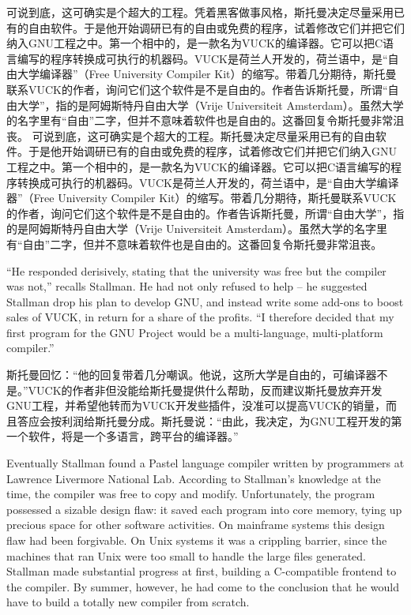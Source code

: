 \ifdefined\chs
\ifdefined\vone
可说到底，这可确实是个超大的工程。凭着黑客做事风格，斯托曼决定尽量采用已有的自由软件。于是他开始调研已有的自由或免费的程序，试着修改它们并把它们纳入GNU工程之中。第一个相中的，是一款名为VUCK的编译器。它可以把C语言编写的程序转换成可执行的机器码。VUCK是荷兰人开发的，荷兰语中，是``自由大学编译器''（Free University Compiler Kit）的缩写。带着几分期待，斯托曼联系VUCK的作者，询问它们这个软件是不是自由的。作者告诉斯托曼，所谓``自由大学''，指的是阿姆斯特丹自由大学（Vrije Universiteit Amsterdam）。虽然大学的名字里有``自由''二字，但并不意味着软件也是自由的。这番回复令斯托曼非常沮丧。
\fi
\ifdefined\vtwo
可说到底，这可确实是个超大的工程。斯托曼决定尽量采用已有的自由软件。于是他开始调研已有的自由或免费的程序，试着修改它们并把它们纳入GNU工程之中。第一个相中的，是一款名为VUCK的编译器。它可以把C语言编写的程序转换成可执行的机器码。VUCK是荷兰人开发的，荷兰语中，是``自由大学编译器''（Free University Compiler Kit）的缩写。带着几分期待，斯托曼联系VUCK的作者，询问它们这个软件是不是自由的。作者告诉斯托曼，所谓``自由大学''，指的是阿姆斯特丹自由大学（Vrije Universiteit Amsterdam）。虽然大学的名字里有``自由''二字，但并不意味着软件也是自由的。这番回复令斯托曼非常沮丧。
\fi
\fi

\ifdefined\eng
``He responded derisively, stating that the university was free but the compiler was not,'' recalls Stallman. \ifdefined\vtwo He had not only refused to help -- he suggested Stallman drop his plan to develop GNU, and instead write some add-ons to boost sales of VUCK, in return for a share of the profits. \fi ``I therefore decided that my first program for the GNU Project would be a multi-language, multi-platform compiler.''
\fi

\ifdefined\chs
斯托曼回忆：``他的回复带着几分嘲讽。他说，这所大学是自由的，可编译器不是。\ifdefined\vtwo ''VUCK的作者非但没能给斯托曼提供什么帮助，反而建议斯托曼放弃开发GNU工程，并希望他转而为VUCK开发些插件，没准可以提高VUCK的销量，而且答应会按利润给斯托曼分成。斯托曼说：``\fi 由此，我决定，为GNU工程开发的第一个软件，将是一个多语言，跨平台的编译器。''
\fi

\ifdefined\vone
\ifdefined\eng
Eventually Stallman found a Pastel language compiler written by programmers at Lawrence Livermore National Lab. According to Stallman's knowledge at the time, the compiler was free to copy and modify. Unfortunately, the program possessed a sizable design flaw: it saved each program into core memory, tying up precious space for other software activities. On mainframe systems this design flaw had been forgivable. On Unix systems it was a crippling barrier, since the machines that ran Unix were too small to handle the large files generated. Stallman made substantial progress at first, building a C-compatible frontend to the compiler. By summer, however, he had come to the conclusion that he would have to build a totally new compiler from scratch.
\fi

